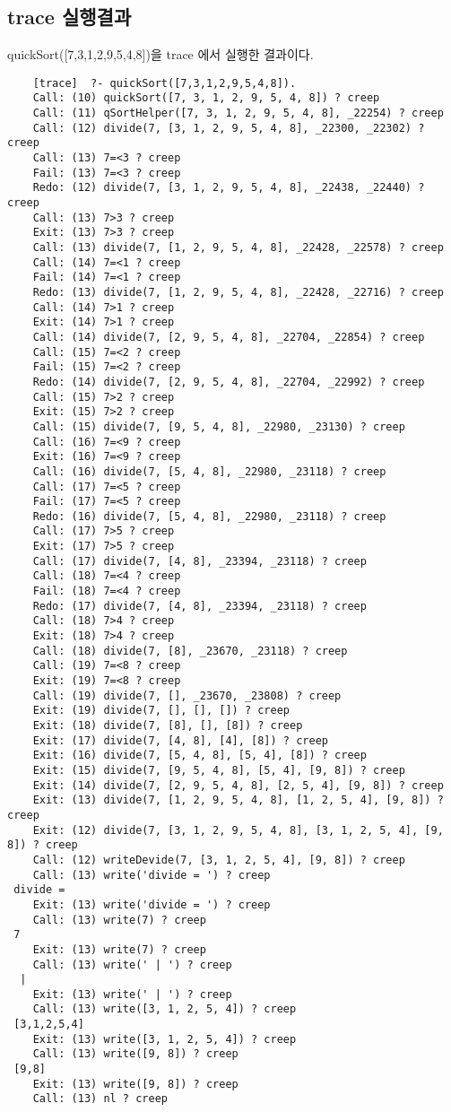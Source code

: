 \documentclass{article}
\begin{document}
\subsection{trace 실행결과}
quickSort([7,3,1,2,9,5,4,8])을 trace 에서 실행한 결과이다.
\begin{lstlisting}
	[trace]  ?- quickSort([7,3,1,2,9,5,4,8]).
	Call: (10) quickSort([7, 3, 1, 2, 9, 5, 4, 8]) ? creep
	Call: (11) qSortHelper([7, 3, 1, 2, 9, 5, 4, 8], _22254) ? creep
	Call: (12) divide(7, [3, 1, 2, 9, 5, 4, 8], _22300, _22302) ? creep
	Call: (13) 7=<3 ? creep
	Fail: (13) 7=<3 ? creep
	Redo: (12) divide(7, [3, 1, 2, 9, 5, 4, 8], _22438, _22440) ? creep
	Call: (13) 7>3 ? creep
	Exit: (13) 7>3 ? creep
	Call: (13) divide(7, [1, 2, 9, 5, 4, 8], _22428, _22578) ? creep
	Call: (14) 7=<1 ? creep
	Fail: (14) 7=<1 ? creep
	Redo: (13) divide(7, [1, 2, 9, 5, 4, 8], _22428, _22716) ? creep
	Call: (14) 7>1 ? creep
	Exit: (14) 7>1 ? creep
	Call: (14) divide(7, [2, 9, 5, 4, 8], _22704, _22854) ? creep
	Call: (15) 7=<2 ? creep
	Fail: (15) 7=<2 ? creep
	Redo: (14) divide(7, [2, 9, 5, 4, 8], _22704, _22992) ? creep
	Call: (15) 7>2 ? creep
	Exit: (15) 7>2 ? creep
	Call: (15) divide(7, [9, 5, 4, 8], _22980, _23130) ? creep
	Call: (16) 7=<9 ? creep
	Exit: (16) 7=<9 ? creep
	Call: (16) divide(7, [5, 4, 8], _22980, _23118) ? creep
	Call: (17) 7=<5 ? creep
	Fail: (17) 7=<5 ? creep
	Redo: (16) divide(7, [5, 4, 8], _22980, _23118) ? creep
	Call: (17) 7>5 ? creep
	Exit: (17) 7>5 ? creep
	Call: (17) divide(7, [4, 8], _23394, _23118) ? creep
	Call: (18) 7=<4 ? creep
	Fail: (18) 7=<4 ? creep
	Redo: (17) divide(7, [4, 8], _23394, _23118) ? creep
	Call: (18) 7>4 ? creep
	Exit: (18) 7>4 ? creep
	Call: (18) divide(7, [8], _23670, _23118) ? creep
	Call: (19) 7=<8 ? creep
	Exit: (19) 7=<8 ? creep
	Call: (19) divide(7, [], _23670, _23808) ? creep
	Exit: (19) divide(7, [], [], []) ? creep
	Exit: (18) divide(7, [8], [], [8]) ? creep
	Exit: (17) divide(7, [4, 8], [4], [8]) ? creep
	Exit: (16) divide(7, [5, 4, 8], [5, 4], [8]) ? creep
	Exit: (15) divide(7, [9, 5, 4, 8], [5, 4], [9, 8]) ? creep
	Exit: (14) divide(7, [2, 9, 5, 4, 8], [2, 5, 4], [9, 8]) ? creep
	Exit: (13) divide(7, [1, 2, 9, 5, 4, 8], [1, 2, 5, 4], [9, 8]) ? creep
	Exit: (12) divide(7, [3, 1, 2, 9, 5, 4, 8], [3, 1, 2, 5, 4], [9, 8]) ? creep
	Call: (12) writeDevide(7, [3, 1, 2, 5, 4], [9, 8]) ? creep
	Call: (13) write('divide = ') ? creep
 divide =
	Exit: (13) write('divide = ') ? creep
	Call: (13) write(7) ? creep
 7
	Exit: (13) write(7) ? creep
	Call: (13) write(' | ') ? creep
  |
	Exit: (13) write(' | ') ? creep
	Call: (13) write([3, 1, 2, 5, 4]) ? creep
 [3,1,2,5,4]
	Exit: (13) write([3, 1, 2, 5, 4]) ? creep
	Call: (13) write([9, 8]) ? creep
 [9,8]
	Exit: (13) write([9, 8]) ? creep
	Call: (13) nl ? creep
 

\end{lstlisting}
\end{document}
